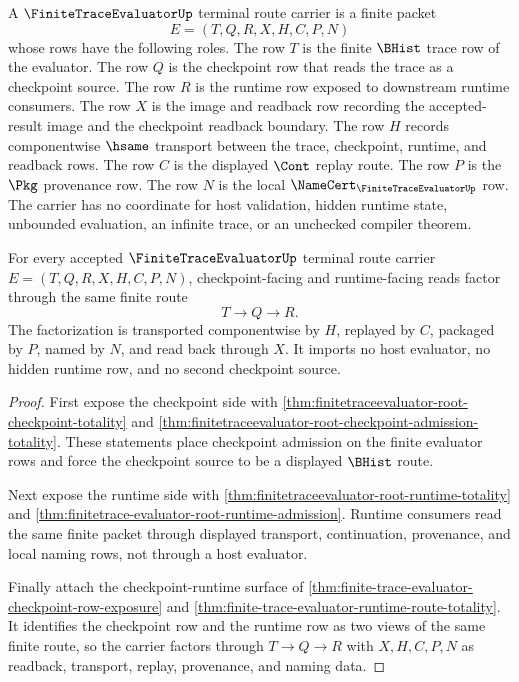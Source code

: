 \begin{definition}
\label{def:finite-trace-evaluator-terminal-route-carrier}
A $\FiniteTraceEvaluatorUp$ terminal route carrier is a finite packet
$$
E=(T,Q,R,X,H,C,P,N)
$$
whose rows have the following roles. The row $T$ is the finite $\BHist$ trace
row of the evaluator. The row $Q$ is the checkpoint row that reads the trace
as a checkpoint source. The row $R$ is the runtime row exposed to downstream
runtime consumers. The row $X$ is the image and readback row recording the
accepted-result image and the checkpoint readback boundary. The row $H$
records componentwise $\hsame$ transport between the trace, checkpoint,
runtime, and readback rows. The row $C$ is the displayed $\Cont$ replay route.
The row $P$ is the $\Pkg$ provenance row. The row $N$ is the local
$\NameCert_{\FiniteTraceEvaluatorUp}$ row. The carrier has no coordinate for
host validation, hidden runtime state, unbounded evaluation, an infinite trace,
or an unchecked compiler theorem.
\end{definition}

\begin{theorem}
\label{thm:finite-trace-evaluator-checkpoint-runtime-factorization}
For every accepted $\FiniteTraceEvaluatorUp$ terminal route carrier
$E=(T,Q,R,X,H,C,P,N)$, checkpoint-facing and runtime-facing reads factor
through the same finite route
$$
T \to Q \to R.
$$
The factorization is transported componentwise by $H$, replayed by $C$,
packaged by $P$, named by $N$, and read back through $X$. It imports no host
evaluator, no hidden runtime row, and no second checkpoint source.
\end{theorem}
\begin{proof}
First expose the checkpoint side with
\autoref{thm:finitetraceevaluator-root-checkpoint-totality} and
\autoref{thm:finitetraceevaluator-root-checkpoint-admission-totality}. These
statements place checkpoint admission on the finite evaluator rows and force
the checkpoint source to be a displayed $\BHist$ route.

Next expose the runtime side with
\autoref{thm:finitetraceevaluator-root-runtime-totality} and
\autoref{thm:finitetrace-evaluator-root-runtime-admission}. Runtime consumers
read the same finite packet through displayed transport, continuation,
provenance, and local naming rows, not through a host evaluator.

Finally attach the checkpoint-runtime surface of
\autoref{thm:finite-trace-evaluator-checkpoint-row-exposure} and
\autoref{thm:finite-trace-evaluator-runtime-route-totality}. It identifies the
checkpoint row and the runtime row as two views of the same finite route, so
the carrier factors through $T \to Q \to R$ with $X,H,C,P,N$ as readback,
transport, replay, provenance, and naming data.
\end{proof}

